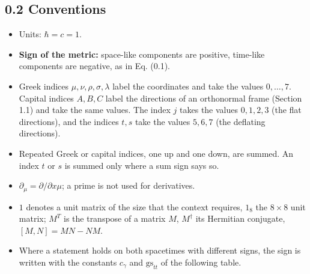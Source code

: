 \documentclass[
  10pt,
]{article}
\providecommand{\tightlist}{%
  \setlength{\itemsep}{0pt}\setlength{\parskip}{0pt}}
\begin{document}
\hypertarget{conventions}{%
\subsection{0.2 Conventions}\label{conventions}}

\begin{itemize}
\tightlist
\item
  Units: \(\hbar=c=1\).
\item
  \textbf{Sign of the metric:} space-like components are positive,
  time-like components are negative, as in Eq. (0.1).
\item
  Greek indices \(\mu,\nu,\rho,\sigma,\lambda\) label the coordinates
  and take the values \(0,\dots,7\). Capital indices \(A,B,C\) label the
  directions of an orthonormal frame (Section 1.1) and take the same
  values. The index \(j\) takes the values \(0,1,2,3\) (the flat
  directions), and the indices \(t,s\) take the values \(5,6,7\) (the
  deflating directions).
\item
  Repeated Greek or capital indices, one up and one down, are summed. An
  index \(t\) or \(s\) is summed only where a sum sign says so.
\item
  \(\partial_\mu=\partial/\partial x\mu\); a prime is not used for
  derivatives.
\item
  \(1\) denotes a unit matrix of the size that the context requires,
  \(1_8\) the \(8\times8\) unit matrix; \(M^T\) is the transpose of a
  matrix \(M\), \(M^\dagger\) its Hermitian conjugate, \([M,N]=MN-NM\).
\item
  Where a statement holds on both spacetimes with different signs, the
  sign is written with the constants \(c_\gamma\) and
  \(\mathrm{gs}_{tt}\) of the following table.
\end{itemize}
\end{document}
